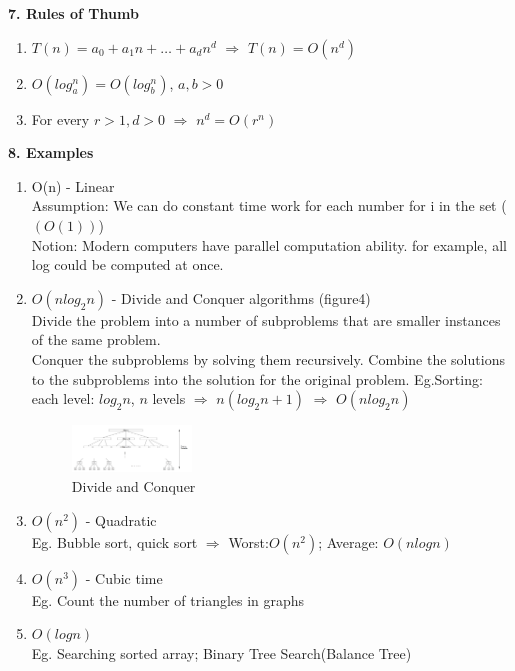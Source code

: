 \pagebreak
\textbf{7. Rules of Thumb} 
\begin{enumerate}
\item 
$T(n) = a_{0} + a_{1}n + \dots + a_{d}n^{d}$ $\Rightarrow$ $T(n) = O(n^{d})$
\item
$O(log_{a}^{n}) = O(log_{b}^{n})$,  $a, b>0$ 
\item
For every $r>1, d>0$ $\Rightarrow$ $n^{d} = O(r^{n})$ 
\end{enumerate}

\textbf{8. Examples}
\begin{enumerate}
\item 
O(n) - Linear\\ 
Assumption: We can do constant time work for each number for i in the set ($(O(1))$)\\
Notion: Modern computers have parallel computation ability. for example, all log could be computed at once.
\item
$O(n log_{2}n)$ - Divide and Conquer algorithms (figure4)\\ 
Divide the problem into a number of subproblems that are smaller instances of the same problem.\\
Conquer the subproblems by solving them recursively.
Combine the solutions to the subproblems into the solution for the original problem.
Eg.Sorting: each level: $log_{2}n$, $n$ levels $\Rightarrow$ $n (log_{2}n +1)$ $\Rightarrow$ $O(n log_{2}n)$
\begin{figure}
\centering
\includegraphics[width=0.3\textwidth]{divide_and_conquer.png}
\caption{\label{fig:divide_and_conquer}Divide and Conquer}
\end{figure}
\item
$O(n^{2})$ - Quadratic\\ 
Eg. Bubble sort, quick sort $\Rightarrow$ Worst:$O(n^{2})$; Average: $O(nlogn)$
\item
$O(n^{3})$ - Cubic time\\ 
Eg. Count the number of triangles in graphs
\item
$O(logn)$\\
Eg. Searching sorted array; Binary Tree Search(Balance Tree)
\end{enumerate}

